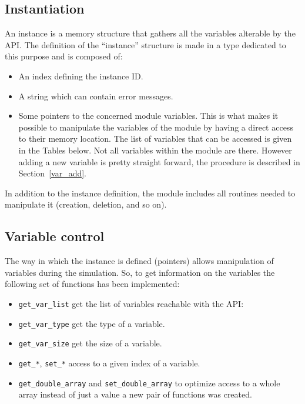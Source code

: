\subsection{Instantiation}\label{subsec:instan}
An instance is a memory structure that gathers all the variables alterable
by the API\@. The definition of the ``instance'' structure is made in a
\fortran{} type dedicated to this purpose and is composed of:

\begin{itemize}
\item An index defining the instance ID\@.
\item A string which can contain error messages.
\item Some pointers to the concerned module variables. This is what makes it
  possible to manipulate the variables of the module by having a direct access
    to their memory location. The list of variables that can be accessed is
    given in the Tables below. Not all
    variables within the module are there. However adding a new variable is
    pretty straight forward, the procedure is described in
    Section~\ref{var_add}.
\end{itemize}







In addition to the instance definition, the module includes all routines needed
to manipulate it (creation, deletion, and so on).

\subsection{Variable control}
\label{subsec:var}
The way in which the instance is defined (pointers) allows manipulation of
variables during the simulation. So, to get information on the variables the
following set of functions has been implemented:

\begin{itemize}

\item \verb!get_var_list! get the list of variables reachable with the API:

\item \verb!get_var_type! get the type of a variable.

\item \verb!get_var_size! get the size of a variable.

\item \verb!get_*!, \verb!set_*! access to a given index of a
  variable.

\item \verb!get_double_array! and \verb!set_double_array! to optimize
  access to a whole array instead of just a value a new pair of
functions was created.

\end{itemize}


